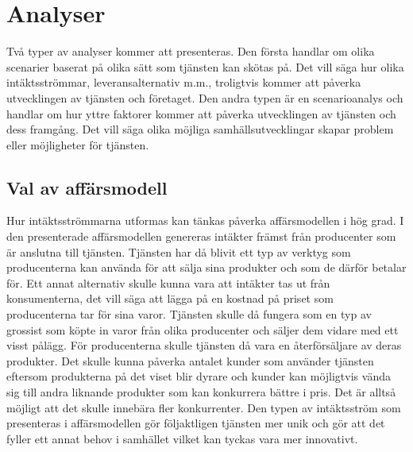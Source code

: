 \documentclass[10pt,a4paper,oneside]{article}
\begin{document}
\newpage

\section{Analyser}
Två typer av analyser kommer att presenteras. Den första handlar om olika scenarier baserat på olika sätt som tjänsten kan skötas på. Det vill säga hur olika intäktsströmmar, leveransalternativ m.m., troligtvis kommer att påverka utvecklingen av tjänsten och företaget. Den andra typen är en scenarioanalys och handlar om hur yttre faktorer kommer att påverka utvecklingen av tjänsten och dess framgång. Det vill säga olika möjliga samhällsutvecklingar skapar problem eller möjligheter för tjänsten. 

\subsection{Val av affärsmodell}
Hur intäktsströmmarna utformas kan tänkas påverka affärsmodellen i hög grad. I den presenterade affärsmodellen genereras intäkter främst från producenter som är anslutna till tjänsten. Tjänsten har då blivit ett typ av verktyg som producenterna kan använda för att sälja sina produkter och som de därför betalar för. Ett annat alternativ skulle kunna vara att intäkter tas ut från konsumenterna, det vill säga att lägga på en kostnad på priset som producenterna tar för sina varor. Tjänsten skulle då fungera som en typ av grossist som köpte in varor från olika producenter och säljer dem vidare med ett visst pålägg. För producenterna skulle tjänsten då vara en återförsäljare av deras produkter. Det skulle kunna påverka antalet kunder som använder tjänsten eftersom produkterna på det viset blir dyrare och kunder kan möjligtvis vända sig till andra liknande produkter som kan konkurrera bättre i pris. Det är alltså möjligt att det skulle innebära fler konkurrenter. Den typen av intäktsström som presenteras i affärsmodellen gör följaktligen tjänsten mer unik och gör att det fyller ett annat behov i samhället vilket kan tyckas vara mer innovativt.\\  
\end{document}
